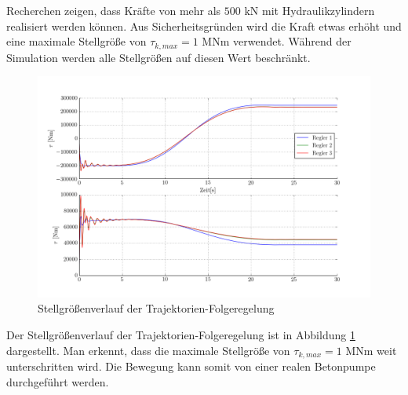 Recherchen zeigen, dass Kräfte von mehr als $500\text{ kN}$ mit Hydraulikzylindern realisiert werden können. Aus Sicherheitsgründen wird die Kraft etwas erhöht und eine maximale Stellgröße von $\tau_{k,max} = 1 \text{ MNm}$ verwendet. Während der Simulation werden alle Stellgrößen auf diesen Wert beschränkt.\newline
\newline
	\begin{figure}[h!]
		\centering
		\includegraphics[scale=0.5]{Bilder/Stellgroessen_Trajektorien_Folgeregelung.png}
		\caption{Stellgrößenverlauf der Trajektorien-Folgeregelung}
		\label{fig:Stellgroessen_Trajektorien_Folgeregelung}
	\end{figure}\newline
Der Stellgrößenverlauf der Trajektorien-Folgeregelung ist in Abbildung \ref{fig:Stellgroessen_Trajektorien_Folgeregelung} dargestellt. Man erkennt, dass die maximale Stellgröße von $\tau_{k,max} = 1 \text{ MNm}$ weit unterschritten wird. Die Bewegung kann somit von einer realen Betonpumpe durchgeführt werden. 


